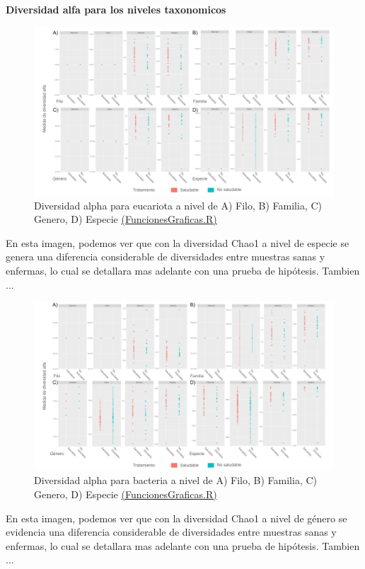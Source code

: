 \textbf{Diversidad alfa para los niveles taxonomicos}

\begin{figure}[h]
\centering
\includegraphics[width=\textwidth]{Img/cap2/Alpha_Eukarya.png}
\caption{Diversidad alpha para eucariota a nivel de A) Filo, B) Familia, C) Genero, D) Especie \href{https://github.com/CamilaSilva1995/Tesis_Maestria/blob/main/Analisis_Comparativo/Fresa_Solena/20230227_Funciones&Graficas.R}{(FuncionesGraficas.R)}}
\end{figure}
En esta imagen, podemos ver que con la diversidad Chao1 a nivel de especie se genera una diferencia considerable de diversidades entre muestras sanas y enfermas, lo cual se detallara mas adelante con una prueba de hipótesis. Tambien ...
\begin{figure}[h]
\centering
\includegraphics[width=\textwidth]{Img/cap2/Alpha_Bacteria.png}
\caption{Diversidad alpha para bacteria a nivel de A) Filo, B) Familia, C) Genero, D) Especie \href{https://github.com/CamilaSilva1995/Tesis_Maestria/blob/main/Analisis_Comparativo/Fresa_Solena/20230227_Funciones&Graficas.R}{(FuncionesGraficas.R)}}
\end{figure}
En esta imagen, podemos ver que con la diversidad Chao1 a nivel de género se evidencia una diferencia considerable de diversidades entre muestras sanas y enfermas, lo cual se detallara mas adelante con una prueba de hipótesis. Tambien ...

